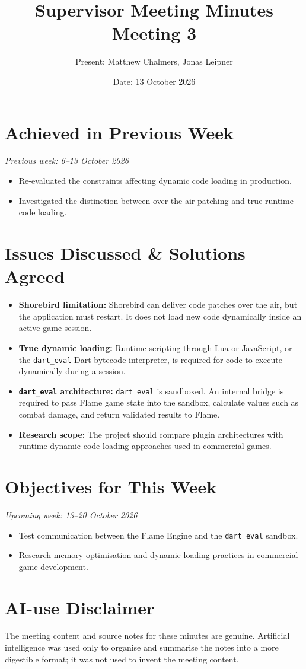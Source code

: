 \documentclass[12pt,a4paper]{article}
\title{\textbf{Supervisor Meeting Minutes}\\Meeting 3}
\author{Present: Matthew Chalmers, Jonas Leipner}
\date{Date: 13 October 2026}
\begin{document}
\maketitle

\section{Achieved in Previous Week}

\noindent\textit{Previous week: 6--13 October 2026}
\begin{itemize}[leftmargin=*]
    \item Re-evaluated the constraints affecting dynamic code loading in production.
    \item Investigated the distinction between over-the-air patching and true runtime code loading.
\end{itemize}

\section{Issues Discussed \& Solutions Agreed}

\begin{itemize}[leftmargin=*]
    \item \textbf{Shorebird limitation:} Shorebird can deliver code patches over the air, but the application must restart. It does not load new code dynamically inside an active game session.
    \item \textbf{True dynamic loading:} Runtime scripting through Lua or JavaScript, or the \texttt{dart\_eval} Dart bytecode interpreter, is required for code to execute dynamically during a session.
    \item \textbf{\texttt{dart\_eval} architecture:} \texttt{dart\_eval} is sandboxed. An internal bridge is required to pass Flame game state into the sandbox, calculate values such as combat damage, and return validated results to Flame.
    \item \textbf{Research scope:} The project should compare plugin architectures with runtime dynamic code loading approaches used in commercial games.
\end{itemize}

\section{Objectives for This Week}

\noindent\textit{Upcoming week: 13--20 October 2026}
\begin{itemize}[leftmargin=*]
    \item Test communication between the Flame Engine and the \texttt{dart\_eval} sandbox.
    \item Research memory optimisation and dynamic loading practices in commercial game development.
\end{itemize}

\section*{\small AI-use Disclaimer}
\small The meeting content and source notes for these minutes are genuine. Artificial intelligence was used only to organise and summarise the notes into a more digestible format; it was not used to invent the meeting content.
\end{document}
